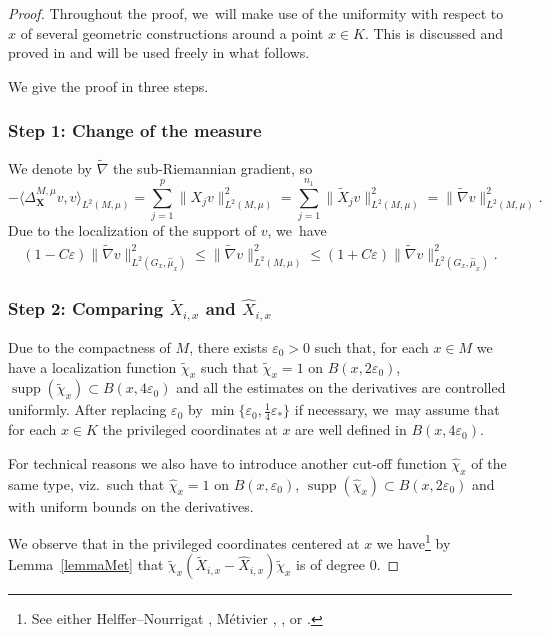 \documentclass[11pt]{article}
\newcommand{\bX}{{\boldsymbol{X}}}
\theoremstyle{definition}
\let\epsilon\varepsilon
\let\Xb\bX
\newcommand{\1}{\mathbbm{1}}
\DeclareMathOperator{\supp}{supp}
\numberwithin{equation}{section}
\begin{document}
\begin{proof}
Throughout the proof, we~will make use of the uniformity with respect to~$x$ of several geometric constructions around a point $x\in K$. This is discussed and proved in \cite{Me,HN, HN1,Rot} and will be used freely in what follows.

We give the proof in three steps.

\subsubsection*{Step 1: Change of the measure}
We denote by $\tilde\nabla$ the sub-Riemannian gradient, so
\[
-\langle\Delta_\Xb^{M,\mu} v,v\rangle_{L^2(M,\mu)} = \sum_{j=1}^p \|X_j v\|_{L^2(M,\mu)}^2 = \sum_{j=1}^{n_1} \|\tilde X_j v\|_{L^2(M,\mu)}^2 = \| \tilde\nabla v \|_{L^2(M,\mu)}^2.
\]
Due to the localization of the support of $v$, we~have
\begin{align*}
(1-C\varepsilon) \| \tilde\nabla v \|_{L^2(G_x,\widehat\mu_x)}^2
\leq \| \tilde\nabla v \|_{L^2(M,\mu)}^2
\leq (1+C\varepsilon) \| \tilde\nabla v \|_{L^2(G_x,\widehat\mu_x)}^2.
\end{align*}

\subsubsection*{Step 2: Comparing $\tilde X_{i,x}$ and $\widehat X_{i,x}$}
Due to the compactness of $M$, there exists $\epsilon_0>0$ such that, for each $x\in M$ we have a localization function $\tilde \chi_x$ such that $\tilde \chi_x = 1$ on $B(x, 2\epsilon_0)$, $\supp(\tilde \chi_x) \subset B (x,4\epsilon_0)$ and all the estimates on the derivatives are controlled uniformly. After replacing $\epsilon_0$ by $\min\{\epsilon_0,\frac14\epsilon_*\}$ if necessary, we~may assume that for each $x\in K$ the privileged coordinates at $x$ are well defined in $B(x,4\varepsilon_0)$.

For technical reasons we also have to introduce another cut-off function $\widehat \chi_x$ of the same type, viz.\ such that $\widehat \chi_x = 1$ on $B(x, \epsilon_0)$, $\supp(\widehat \chi_x) \subset B (x,2\epsilon_0)$ and with uniform bounds on the derivatives.

We observe that in the privileged coordinates centered at $x$ we have\footnote{See either Helffer--Nourrigat \cite[Prop.\,5.1]{HN}, Métivier \cite{Me}, \cite[\S 4.2.4]{EL}, or \cite[\S 1]{Rot}.} by Lemma~\ref{lemmaMet} that
$
\tilde \chi_x (\tilde X_{i,x} -\widehat X_{i,x}) \tilde\chi_x
$
is of degree $0$.


\end{proof}
\end{document}
